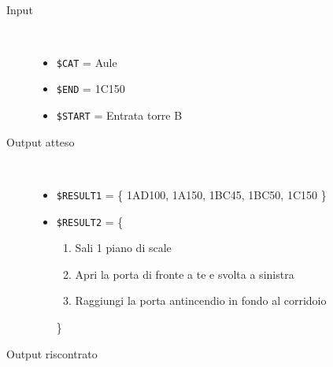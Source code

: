\documentclass[../../Sperimentazione.tex]{subfiles}
\begin{document}
			\paragraph*{}
			\label{Prova1A.1}
			\begin{tcolorbox}[fonttitle=\bfseries, 
								adjusted title={\Large Prova 1A.1}, 
								breakable, 
								sharp corners=south,
								colback=white, 
								colframe=white!60!black]
								
				\begin{description}%
				
					\item[Input] \ \par 
        				\begin{itemize}
        					\item \verb|$CAT| = Aule
							\item \verb|$END| = 1C150
							\item \verb|$START| = Entrata torre B
        				\end{itemize}
        				
        			\tcbline 
        				
        			\item[Output atteso] \ \par
        				\begin{itemize}
        				
        					\item \verb|$RESULT1| = \{
        						1AD100, 1A150, 1BC45, 1BC50, 1C150
        					\}
        				
        					\item \verb|$RESULT2| = \{
        					\begin{enumerate}
        						\item Sali 1 piano di scale
								\item Apri la porta di fronte a te e svolta a sinistra
								\item Raggiungi la porta antincendio in fondo al corridoio
        					\end{enumerate}
        					\}
        					
        				\end{itemize}

					\tcbline				
        				
        			\item[Output riscontrato] \ \par
        				\begin{description}
        				

\end{description}
\end{description}
\end{tcolorbox}
\end{document}

